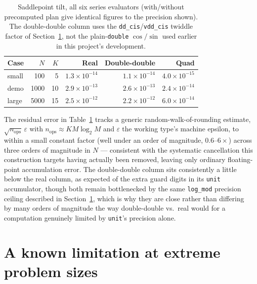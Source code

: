 \documentclass[11pt]{article}
\newcommand{\eps}{\varepsilon}
\begin{document}
\begin{table}[h]
\centering
\caption{Saddlepoint tilt, all six series evaluators (with/without precomputed plan
give identical figures to the precision shown). The double-double column uses the
\texttt{dd\_cis}/\texttt{vdd\_cis} twiddle factor of Section~\ref{sec:limitations},
not the plain-\texttt{double} $\cos/\sin$ used earlier in this project's development.}
\label{tab:all-evaluators}
\begin{tabular}{@{}lrrrrr@{}}
\toprule
Case & $N$ & $K$ & Real & Double-double & Quad \\
\midrule
small  & 100   & 5  & $1.3\times 10^{-14}$ & $1.1\times 10^{-14}$ & $4.0\times 10^{-15}$ \\
demo   & 1000  & 10 & $2.9\times 10^{-13}$ & $2.6\times 10^{-13}$ & $2.4\times 10^{-14}$ \\
large  & 5000  & 15 & $2.5\times 10^{-12}$ & $2.2\times 10^{-12}$ & $6.0\times 10^{-14}$ \\
\bottomrule
\end{tabular}
\end{table}

The residual error in Table~\ref{tab:all-evaluators} tracks a generic
random-walk-of-rounding estimate, $\sqrt{n_{\text{ops}}}\,\eps$ with
$n_{\text{ops}}\approx K M\log_2 M$ and $\eps$ the working type's machine epsilon, to
within a small constant factor (well under an order of magnitude, $0.6$--$6\times$)
across three orders of magnitude in $N$ --- consistent with the systematic cancellation
this construction targets having actually been removed, leaving only ordinary
floating-point accumulation error. The double-double column sits consistently a little
below the real column, as expected of the extra guard digits in its \texttt{unit}
accumulator, though both remain bottlenecked by the same \texttt{log\_mod} precision
ceiling described in Section~\ref{sec:limitations}, which is why they are close rather
than differing by many orders of magnitude the way double-double vs.\ real would for a
computation genuinely limited by \texttt{unit}'s precision alone.

\section{A known limitation at extreme problem sizes}
\label{sec:limitations}
\end{document}
